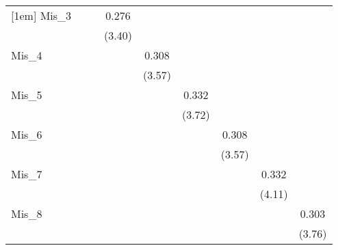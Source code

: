 \documentclass{article}
\begin{document}
{\begin{tabular}{l*{8}{c}}
[1em]
Mis\_3       &                     &                     &       0.276\sym{***}&                     &                     &                     &                     &                     \\
            &                     &                     &      (3.40)         &                     &                     &                     &                     &                     \\
[1em]
Mis\_4       &                     &                     &                     &       0.308\sym{***}&                     &                     &                     &                     \\
            &                     &                     &                     &      (3.57)         &                     &                     &                     &                     \\
[1em]
Mis\_5       &                     &                     &                     &                     &       0.332\sym{***}&                     &                     &                     \\
            &                     &                     &                     &                     &      (3.72)         &                     &                     &                     \\
[1em]
Mis\_6       &                     &                     &                     &                     &                     &       0.308\sym{***}&                     &                     \\
            &                     &                     &                     &                     &                     &      (3.57)         &                     &                     \\
[1em]
Mis\_7       &                     &                     &                     &                     &                     &                     &       0.332\sym{***}&                     \\
            &                     &                     &                     &                     &                     &                     &      (4.11)         &                     \\
[1em]
Mis\_8       &                     &                     &                     &                     &                     &                     &                     &       0.303\sym{***}\\
            &                     &                     &                     &                     &                     &                     &                     &      (3.76)         \\

\end{tabular}}
\end{document}
